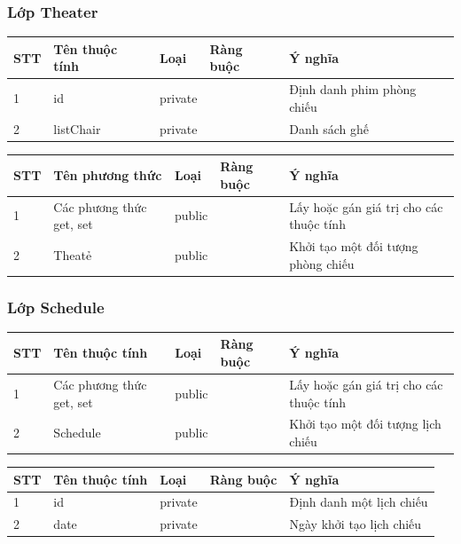 \documentclass[a4paper, 12pt]{article}
\begin{document}
\subsubsection{Lớp Theater}
\begin{table}[H]
\centering
\begin{tabular}{|l|l|l|l|l|}
\hline
STT & Tên thuộc tính & Loại    & Ràng buộc & Ý nghĩa                    \\ \hline
1   & id           	 & private &           & Định danh phim phòng chiếu \\ \hline
2   & listChair      & private &           & Danh sách ghế              \\ \hline
\end{tabular}
\end{table}
\begin{table}[H]
\centering
\begin{tabular}{|l|l|l|l|l|}
\hline
STT & Tên phương thức          & Loại   & Ràng buộc & Ý nghĩa                                 \\ \hline
1   & Các phương thức get, set & public &           & Lấy hoặc gán giá trị cho các thuộc tính \\ \hline
2   & Theatẻ                   & public &           & Khởi tạo một đối tượng phòng chiếu      \\ \hline
\end{tabular}
\end{table}

\subsubsection{Lớp Schedule}
\begin{table}[H]
\centering
\begin{tabular}{|l|l|l|l|l|}
\hline
STT & Tên thuộc tính           & Loại   & Ràng buộc & Ý nghĩa                                 \\ \hline
1   & Các phương thức get, set & public &           & Lấy hoặc gán giá trị cho các thuộc tính \\ \hline
2   & Schedule                 & public &           & Khởi tạo một đối tượng lịch chiếu       \\ \hline
\end{tabular}
\end{table}

\begin{table}[H]
\centering
\begin{tabular}{|l|l|l|l|l|}
\hline
STT & Tên thuộc tính  & Loại    & Ràng buộc & Ý nghĩa                  \\ \hline
1   & id              & private &           & Định danh một lịch chiếu \\ \hline
2   & date            & private &           & Ngày khởi tạo lịch chiếu \\ \hline
\end{tabular}
\end{table}
\end{document}
